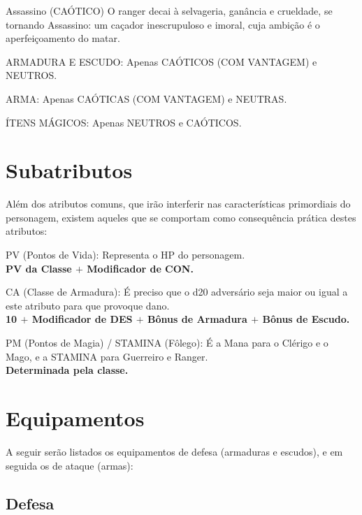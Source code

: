 \documentclass[10pt,twoside,twocolumn]{book}
\begin{document}
\begin{rpg-warnbox}{Assassino (CAÓTICO)}
	 O ranger decai à selvageria, ganância e crueldade, se tornando Assassino: um caçador inescrupuloso e imoral, cuja ambição é o aperfeiçoamento do matar.
    \begin{rpg-list}
      	\item ARMADURA E ESCUDO: Apenas CAÓTICOS (COM VANTAGEM) e NEUTROS.
    	\item ARMA: Apenas CAÓTICAS (COM VANTAGEM) e NEUTRAS.
    	\item ÍTENS MÁGICOS: Apenas NEUTROS e CAÓTICOS.
    \end{rpg-list}
\end{rpg-warnbox}

\section{Subatributos}

Além dos atributos comuns, que irão interferir nas características primordiais do personagem, existem aqueles que se comportam como consequência prática destes atributos:

\begin{rpg-list}
      	\item PV (Pontos de Vida): Representa o HP do personagem.\\
        \textbf{PV da Classe $+$ Modificador de CON.}
        \item CA (Classe de Armadura): É preciso que o d20 adversário seja maior ou igual a este atributo para que provoque dano.\\
        \textbf{10 $+$ Modificador de DES $+$ Bônus de Armadura $+$ Bônus de Escudo.}
        \item PM (Pontos de Magia) / STAMINA (Fôlego): É a Mana para o Clérigo e o Mago, e a STAMINA para Guerreiro e Ranger.\\
        \textbf{Determinada pela classe.}
\end{rpg-list}

\section{Equipamentos}

A seguir serão listados os equipamentos de defesa (armaduras e escudos), e em seguida os de ataque (armas):
 
\subsection{Defesa}
\end{document}
